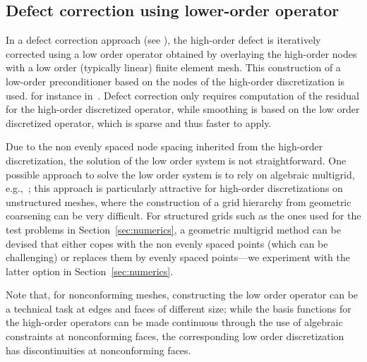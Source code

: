 \documentclass[smallcondensed,final]{svjour3}     %
\newcommand{\gsnote}[1]{\textcolor{blue}{GS: #1}}
\begin{document}
\subsection{Defect correction using lower-order operator}\label{subsec:low}
In a defect correction approach (see
\cite{TrottenbergOosterleeSchuller01, Hackbusch85}), the high-order defect is
iteratively corrected using a low order operator obtained by
overlaying the high-order nodes with a low order (typically linear)
finite element mesh.  This construction of a low-order preconditioner
based on the nodes of the high-order discretization is used. for
instance
in~\cite{Brown10,Kim07,DevilleMund90,HeysManteuffelMcCormickEtAl05}.
Defect correction
only requires computation of the residual for the high-order
discretized operator, while smoothing is based on the low order
discretized operator, which is sparse and thus faster to apply.

Due to the non evenly spaced node spacing inherited from the
high-order discretization, the solution of the low order system is not
straightforward. One possible approach to solve the low order system
is to rely on algebraic multigrid,
e.g.,~\cite{Brown10,HeysManteuffelMcCormickEtAl05}; this approach is
particularly attractive for high-order discretizations on unstructured
meshes, where the construction of a grid hierarchy from geometric
coarsening can be very difficult. For structured grids such as the
ones used for the test problems in Section~\ref{sec:numerics}, a
geometric multigrid method can be devised that either copes with the
non evenly spaced points (which can be challenging) or replaces them
by evenly spaced points---we experiment with the latter option in
Section~\ref{sec:numerics}.

Note that, for nonconforming meshes, constructing the low order
operator can be a technical task at edges and faces of different size;
while the basis functions for the high-order operators can be made
continuous through the use of algebraic constraints at nonconforming
faces, the corresponding low order discretization has discontinuities
at nonconforming faces.



\end{document}
